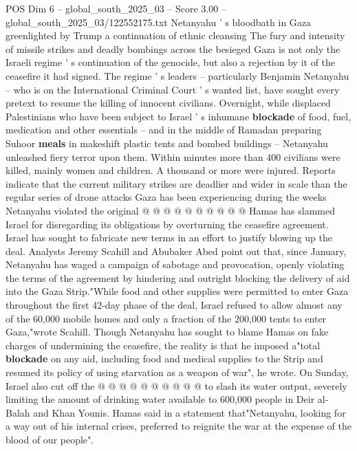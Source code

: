 \begin{textsample}{POS Dim 6 – global\_south\_2025\_03 – Score 3.00 – global\_south\_2025\_03/122552175.txt}  \label{ex:f6_pos_315}
Netanyahu ' s bloodbath in Gaza greenlighted by Trump a continuation of ethnic cleansing The fury and intensity of missile strikes and deadly bombings across the besieged Gaza is not only the Israeli regime ' s continuation of the genocide, but also a rejection by it of the ceasefire it had signed.
The regime ' s leaders -- particularly Benjamin Netanyahu -- who is on the International Criminal Court ' s wanted list, have sought every pretext to resume the killing of innocent civilians.
Overnight, while displaced Palestinians who have been subject to Israel ' s inhumane \textbf{blockade} of food, fuel, medication and other essentials -- and in the middle of Ramadan preparing Suhoor \textbf{meals} in makeshift plastic tents and bombed buildings -- Netanyahu unleashed fiery terror upon them.
Within minutes more than 400 civilians were killed, mainly women and children.
A thousand or more were injured.
Reports indicate that the current military strikes are deadlier and wider in scale than the regular series of drone attacks Gaza has been experiencing during the weeks Netanyahu violated the original @ @ @ @ @ @ @ @ @ @ Hamas has slammed Israel for disregarding its obligations by overturning the ceasefire agreement.
Israel has sought to fabricate new terms in an effort to justify blowing up the deal.
Analysts Jeremy Scahill and Abubaker Abed point out that, since January, Netanyahu has waged a campaign of sabotage and provocation, openly violating the terms of the agreement by hindering and outright blocking the delivery of aid into the Gaza Strip."While food and other supplies were permitted to enter Gaza throughout the first 42-day phase of the deal, Israel refused to allow almost any of the 60,000 mobile homes and only a fraction of the 200,000 tents to enter Gaza,"wrote Scahill.
Though Netanyahu has sought to blame Hamas on fake charges of undermining the ceasefire, the reality is that he imposed a"total \textbf{blockade} on any aid, including food and medical supplies to the Strip and resumed its policy of using starvation as a weapon of war", he wrote.
On Sunday, Israel also cut off the @ @ @ @ @ @ @ @ @ @ to slash its water output, severely limiting the amount of drinking water available to 600,000 people in Deir al-Balah and Khan Younis.
Hamas said in a statement that"Netanyahu, looking for a way out of his internal crises, preferred to reignite the war at the expense of the blood of our people".

\end{textsample}
